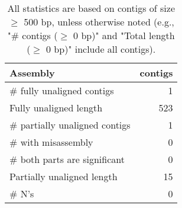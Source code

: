 \documentclass[12pt,a4paper]{article}
\begin{document}
\begin{table}[ht]
\begin{center}
\caption{All statistics are based on contigs of size $\geq$ 500 bp, unless otherwise noted (e.g., "\# contigs ($\geq$ 0 bp)" and "Total length ($\geq$ 0 bp)" include all contigs).}
\begin{tabular}{|l*{1}{|r}|}
\hline
Assembly & contigs \\ \hline
\# fully unaligned contigs & 1 \\ \hline
Fully unaligned length & 523 \\ \hline
\# partially unaligned contigs & 1 \\ \hline
\hspace{5mm}\# with misassembly & 0 \\ \hline
\hspace{5mm}\# both parts are significant & 0 \\ \hline
Partially unaligned length & 15 \\ \hline
\# N's & 0 \\ \hline
\end{tabular}
\end{center}
\end{table}
\end{document}
